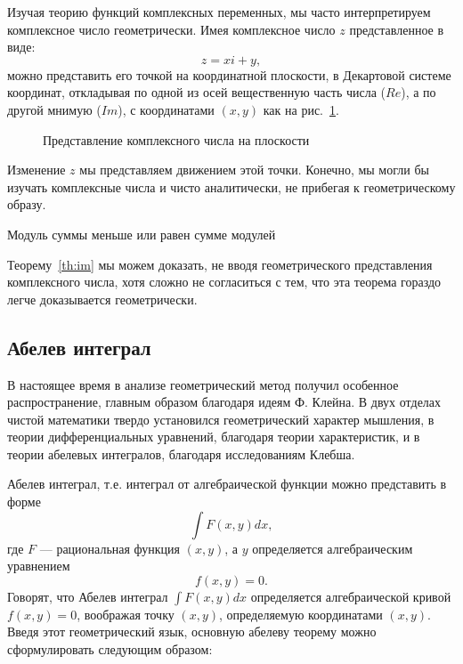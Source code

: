 Изучая теорию функций комплексных переменных, мы часто интерпретируем
комплексное число геометрически. Имея комплексное число $z$ представленное в
виде:
\begin{equation}
  z = xi + y,
\end{equation}
можно представить его точкой на координатной плоскости, в Декартовой системе
координат, откладывая по одной из осей вещественную часть числа ($Re$), а по
другой мнимую ($Im$), с координатами $(x, y)$ как на рис.~\ref{fig:im}.
\begin{figure}[H]
  \centering
  \caption{Представление комплексного числа на плоскости}\label{fig:im}
\end{figure}

Изменение $z$ мы представляем движением этой точки. Конечно, мы могли бы
изучать комплексные числа и чисто аналитически, не прибегая к геометрическому
образу.

\begin{theorem}\label{th:im}
  Модуль суммы меньше или равен сумме модулей
\end{theorem}

Теорему~\ref{th:im} мы можем доказать, не вводя геометрического представления
комплексного числа, хотя сложно не согласиться с тем, что эта теорема гораздо
легче доказывается геометрически.

\subsection{Абелев интеграл}

В настоящее время в анализе геометрический метод получил особенное
распространение, главным образом благодаря идеям Ф. Клейна. В двух отделах
чистой математики твердо установился геометрический характер мышления, в
теории дифференциальных уравнений, благодаря теории характеристик, и в теории
абелевых интегралов, благодаря исследованиям Клебша.

Абелев интеграл, т.е. интеграл от алгебраической функции можно представить в
форме 
\begin{equation}
  \int F(x,y)dx,
\end{equation}
где $F$ --- рациональная функция $(x,y)$, а $y$ определяется алгебраическим
уравнением
\begin{equation}
  f(x,y) = 0.
\end{equation}
Говорят, что Абелев интеграл $\int F(x,y)dx$ определяется алгебраической кривой
$f(x,y)=0$, воображая точку $(x,y)$, определяемую координатами $(x,y)$. Введя
этот геометрический язык, основную абелеву теорему можно сформулировать
следующим образом:

